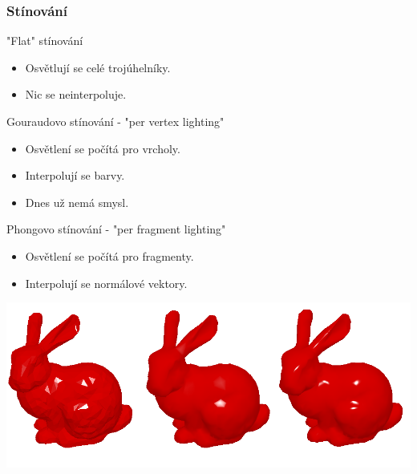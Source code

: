 \begin{frame}
    \frametitle{Stínování}

    "Flat" stínování
    \begin{itemize}
        \item Osvětlují se celé trojúhelníky.
        \item Nic se neinterpoluje.
    \end{itemize}

    Gouraudovo stínování - "per vertex lighting"
    \begin{itemize}
        \item Osvětlení se počítá pro vrcholy.
        \item Interpolují se barvy.
        \item Dnes už nemá smysl.
    \end{itemize}

    Phongovo stínování - "per fragment lighting"
    \begin{itemize}
        \item Osvětlení se počítá pro fragmenty.
        \item Interpolují se normálové vektory.
    \end{itemize}

    \includegraphics[width=\textwidth]{pics/physicallyBasedRendering/shading}
\end{frame}

